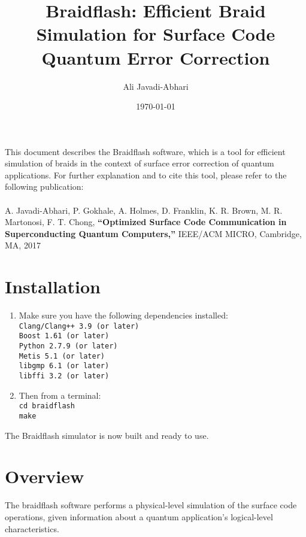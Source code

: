 \documentclass{article}
\begin{document}
\title{Braidflash: Efficient Braid Simulation for Surface Code Quantum Error Correction}
\author{Ali Javadi-Abhari}
\date{\today}
\maketitle

This document describes the Braidflash software, which is a tool for efficient simulation of braids in the context of surface error correction of quantum applications. For further explanation and to cite this tool, please refer to the following publication:
\\
\\
A. Javadi-Abhari, P. Gokhale, A. Holmes, D. Franklin, K. R. Brown, M. R. Martonosi, F. T. Chong, {\bf ``Optimized Surface Code Communication in Superconducting Quantum Computers,''} IEEE/ACM MICRO, Cambridge, MA, 2017

\section{Installation}
\begin{enumerate}

\item Make sure you have the following dependencies installed:
{\tt\\
Clang/Clang++ 3.9 (or later)\\
Boost 1.61 (or later)\\
Python 2.7.9 (or later)\\
Metis 5.1 (or later)\\
libgmp 6.1 (or later)\\
libffi 3.2 (or later)\\}

\item Then from a terminal:
{\tt\\
cd braidflash\\
make\\}
\end{enumerate}

The Braidflash simulator is now built and ready to use.



\section{Overview}
The braidflash software performs a physical-level simulation of the surface code operations, given information about a quantum application's logical-level characteristics. 
\end{document}
